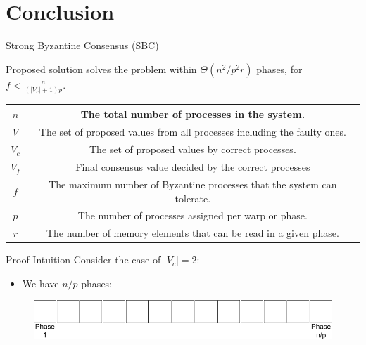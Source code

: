 \documentclass{beamer}
\begin{document}
\section{Conclusion}
\begin{frame}{Strong Byzantine Consensus (SBC)}
\begin{theorem}[\sbc] 
Proposed solution solves the \sbc problem within $\Theta(n^2/p^2r)$ phases, for $f< \frac{n}{(|V_c|+1)p}$.
\end{theorem}
\begin{table}[]
\scriptsize
\begin{tabular}{|c|c|}
\hline
\textbf{$n$} & The total number of processes in the system. \\ 
\hline
\textbf{$V$} & The set of proposed values from all processes including the faulty ones. \\ 
\hline
\textbf{$V_c$} & The set of proposed values by correct processes. \\ 
\hline
\textbf{$V_f$} & Final consensus value decided by the  correct processes \\ 
\hline
\textbf{$f$} & The maximum number of Byzantine processes that the system can tolerate. \\ 
\hline
\textbf{$p$} & The number of processes assigned per warp or phase. \\ 
\hline
\textbf{$r$} & The number of memory elements that can be read in a given phase. \\ 
\hline
\end{tabular}
\end{table}

\end{frame}


\begin{frame}{Proof Intuition}
Consider the case of $|V_c|=2$:
\begin{itemize}
    \item We have $n/p$ phases:
\end{itemize}
\begin{figure}[t]
\centering
\includegraphics[scale=0.35]{proof1.png}
\vspace{-2em}
\label{fig:SysModel}
\end{figure}
\end{frame}
\end{document}
